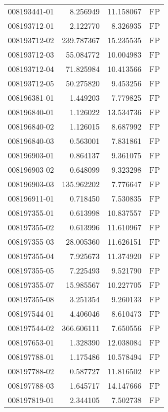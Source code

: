 \begin{tabular}{lrrl}
008193441-01 &    8.256949 &      11.158067 &   FP \\
008193712-01 &    2.122770 &       8.326935 &   FP \\
008193712-02 &  239.787367 &      15.235535 &   FP \\
008193712-03 &   55.084772 &      10.004983 &   FP \\
008193712-04 &   71.825984 &      10.413566 &   FP \\
008193712-05 &   50.275820 &       9.453256 &   FP \\
008196381-01 &    1.449203 &       7.779825 &   FP \\
008196840-01 &    1.126022 &      13.534736 &   FP \\
008196840-02 &    1.126015 &       8.687992 &   FP \\
008196840-03 &    0.563001 &       7.831861 &   FP \\
008196903-01 &    0.864137 &       9.361075 &   FP \\
008196903-02 &    0.648099 &       9.323298 &   FP \\
008196903-03 &  135.962202 &       7.776647 &   FP \\
008196911-01 &    0.718450 &       7.530835 &   FP \\
008197355-01 &    0.613998 &      10.837557 &   FP \\
008197355-02 &    0.613996 &      11.610967 &   FP \\
008197355-03 &   28.005360 &      11.626151 &   FP \\
008197355-04 &    7.925673 &      11.374920 &   FP \\
008197355-05 &    7.225493 &       9.521790 &   FP \\
008197355-07 &   15.985567 &      10.227705 &   FP \\
008197355-08 &    3.251354 &       9.260133 &   FP \\
008197544-01 &    4.406046 &       8.610473 &   FP \\
008197544-02 &  366.606111 &       7.650556 &   FP \\
008197653-01 &    1.328390 &      12.038084 &   FP \\
008197788-01 &    1.175486 &      10.578494 &   FP \\
008197788-02 &    0.587727 &      11.816502 &   FP \\
008197788-03 &    1.645717 &      14.147666 &   FP \\
008197819-01 &    2.344105 &       7.502738 &   FP \\

\end{tabular}
